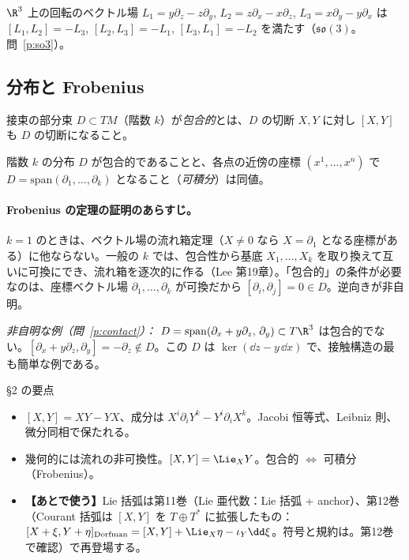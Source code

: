 \begin{ex}\label{ex:so3}
$\R^3$ 上の回転のベクトル場 $L_1=y\partial_z-z\partial_y$, $L_2=z\partial_x-x\partial_z$, $L_3=x\partial_y-y\partial_x$ は $[L_1,L_2]=-L_3$, $[L_2,L_3]=-L_1$, $[L_3,L_1]=-L_2$ を満たす（$\mathfrak{so}(3)$。問~\ref{p:so3}）。
\end{ex}

\subsection{分布と Frobenius}
接束の部分束 $D\subset TM$（階数 $k$）が\emph{包合的}とは、$D$ の切断 $X,Y$ に対し $[X,Y]$ も $D$ の切断になること。

\begin{thm}[Frobenius]\tC
階数 $k$ の分布 $D$ が包合的であることと、各点の近傍の座標 $(x^1,\dots,x^n)$ で $D=\mathrm{span}(\partial_1,\dots,\partial_k)$ となること（\emph{可積分}）は同値。
\end{thm}


\paragraph{Frobenius の定理の証明のあらすじ。}$k=1$ のときは、ベクトル場の流れ箱定理（$X\ne0$ なら $X=\partial_1$ となる座標がある）に他ならない。一般の $k$ では、包合性から基底 $X_1,\dots,X_k$ を取り換えて互いに可換にでき、流れ箱を逐次的に作る（Lee 第19章）。「包合的」の条件が必要なのは、座標ベクトル場 $\partial_1,\dots,\partial_k$ が可換だから $[\partial_i,\partial_j]=0\in D$。逆向きが非自明。

\emph{非自明な例（問~\ref{p:contact}）：} $D=\mathrm{span}(\partial_x+y\partial_z,\,\partial_y)\subset T\R^3$ は包合的でない。$[\partial_x+y\partial_z,\partial_y]=-\partial_z\notin D$。この $D$ は $\ker(\dd z-y\,\dd x)$ で、接触構造の最も簡単な例である。

\begin{keybox}{§2 の要点}
\begin{itemize}
\item $[X,Y]=XY-YX$、成分は $X^i\partial_iY^k-Y^i\partial_iX^k$。Jacobi 恒等式、Leibniz 則、微分同相で保たれる。
\item 幾何的には流れの非可換性。$[X,Y]=\Lie_XY$。包合的 $\Leftrightarrow$ 可積分（Frobenius）。
\item \textbf{【あとで使う】}Lie 括弧は第11巻（Lie 亜代数：Lie 括弧 + anchor）、第12巻（Courant 括弧は $[X,Y]$ を $T\oplus T^*$ に拡張したもの：$[X+\xi,Y+\eta]_{\mathrm{Dorfman}}=[X,Y]+\Lie_X\eta-\iota_Y\dd\xi$。符号と規約は\tQ。第12巻で確認）で再登場する。
\end{itemize}
\end{keybox}


